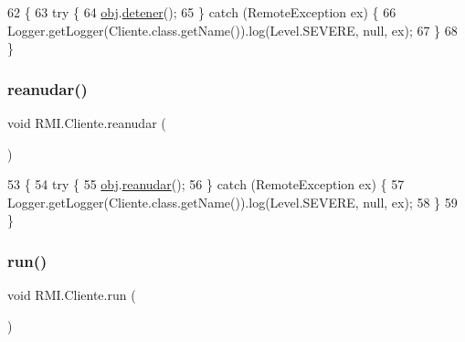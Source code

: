\begin{DoxyCode}
62     \{
63         \textcolor{keywordflow}{try} \{
64             \mbox{\hyperlink{class_r_m_i_1_1_cliente_ac0b62b87dd4c8edc00a335d7f029f8fa}{obj}}.\mbox{\hyperlink{interface_r_m_i_1_1_interface_saluda_a271848a330c374eb0f6f5157cc2b60c6}{detener}}();
65         \} \textcolor{keywordflow}{catch} (RemoteException ex) \{
66             Logger.getLogger(Cliente.class.getName()).log(Level.SEVERE, null, ex);
67         \}
68     \}
\end{DoxyCode}
\mbox{\label{class_r_m_i_1_1_cliente_ae9504706637d8e4abfe5e11760fa9ce9}} 
\subsubsection{\texorpdfstring{reanudar()}{reanudar()}}
{\footnotesize\ttfamily void R\+M\+I.\+Cliente.\+reanudar (\begin{DoxyParamCaption}{ }\end{DoxyParamCaption})\hspace{0.3cm}{\ttfamily [inline]}}


\begin{DoxyCode}
53     \{
54         \textcolor{keywordflow}{try} \{
55             \mbox{\hyperlink{class_r_m_i_1_1_cliente_ac0b62b87dd4c8edc00a335d7f029f8fa}{obj}}.\mbox{\hyperlink{interface_r_m_i_1_1_interface_saluda_a8d97c9155ed6c35d8691263d1b70000a}{reanudar}}();
56         \} \textcolor{keywordflow}{catch} (RemoteException ex) \{
57             Logger.getLogger(Cliente.class.getName()).log(Level.SEVERE, null, ex);
58         \}
59     \}
\end{DoxyCode}
\mbox{\label{class_r_m_i_1_1_cliente_a6ecb7f16d4b6a7dc46ce4302f45a0fe9}} 
\subsubsection{\texorpdfstring{run()}{run()}}
{\footnotesize\ttfamily void R\+M\+I.\+Cliente.\+run (\begin{DoxyParamCaption}{ }\end{DoxyParamCaption})\hspace{0.3cm}{\ttfamily [inline]}}


